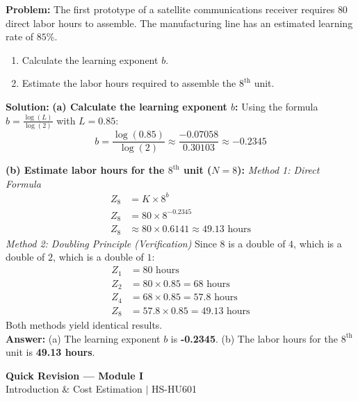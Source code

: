 \documentclass[12pt,a4paper]{article}
\begin{document}
\begin{tcolorbox}[examplebox, title={Example 3: Learning Curve Model}]
\textbf{Problem:} The first prototype of a satellite communications receiver requires $80$ direct labor hours to assemble. The manufacturing line has an estimated learning rate of $85\%$.
\begin{enumerate}[label=\alph*., leftmargin=*, itemsep=2pt, topsep=2pt]
  \item Calculate the learning exponent $b$.
  \item Estimate the labor hours required to assemble the $8^{\text{th}}$ unit.
\end{enumerate}
\textbf{Solution:}
\textbf{(a) Calculate the learning exponent $b$:}
Using the formula $b = \frac{\log(L)}{\log(2)}$ with $L = 0.85$:
\begin{equation*}
  b = \frac{\log(0.85)}{\log(2)} \approx \frac{-0.07058}{0.30103} \approx -0.2345
\end{equation*}

\textbf{(b) Estimate labor hours for the $8^{\text{th}}$ unit ($N = 8$):}
\textit{Method 1: Direct Formula}
\begin{align*}
  Z_8 &= K \times 8^b \\
  Z_8 &= 80 \times 8^{-0.2345} \\
  Z_8 &\approx 80 \times 0.6141 \approx 49.13 \text{ hours}
\end{align*}
\textit{Method 2: Doubling Principle (Verification)}
Since $8$ is a double of $4$, which is a double of $2$, which is a double of $1$:
\begin{align*}
  Z_1 &= 80 \text{ hours} \\
  Z_2 &= 80 \times 0.85 = 68 \text{ hours} \\
  Z_4 &= 68 \times 0.85 = 57.8 \text{ hours} \\
  Z_8 &= 57.8 \times 0.85 = 49.13 \text{ hours}
\end{align*}
Both methods yield identical results.\\[4pt]
\textbf{Answer:} (a) The learning exponent $b$ is \textbf{-0.2345}. (b) The labor hours for the $8^{\text{th}}$ unit is \textbf{49.13 hours}.
\end{tcolorbox}

\newpage
\begin{center}
  {\large\bfseries\color{myred} Quick Revision --- Module I}\\[3pt]
  {\small\color{mydark} Introduction \& Cost Estimation $|$ HS-HU601}
\end{center}
\noindent{\color{myred}\rule{\linewidth}{1.2pt}}
\vspace{4pt}
\end{document}
